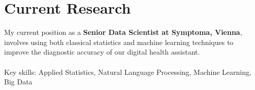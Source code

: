 \section{Current Research}
\noindent My current position as a \textbf{Senior Data Scientist at Symptoma, Vienna}, involves using both classical statistics and machine learning techniques to improve the diagnostic accuracy of our digital health assistant.\\ \\
Key skills: Applied Statistics, Natural Language Processing, Machine Learning, Big Data
